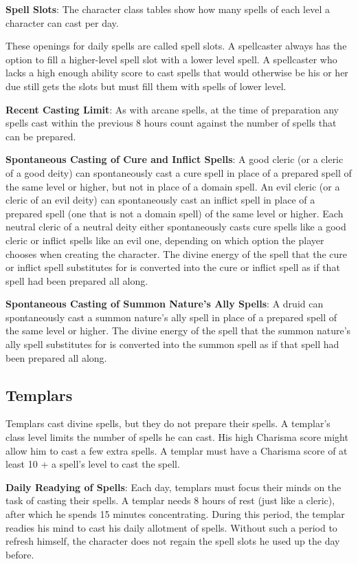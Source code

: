 \textbf{Spell Slots}: The character class tables show how many spells of each level a character can cast per day.

These openings for daily spells are called spell slots. A spellcaster always has the option to fill a higher-level spell slot with a lower level spell. A spellcaster who lacks a high enough ability score to cast spells that would otherwise be his or her due still gets the slots but must fill them with spells of lower level.

\textbf{Recent Casting Limit}: As with arcane spells, at the time of preparation any spells cast within the previous 8 hours count against the number of spells that can be prepared.

\textbf{Spontaneous Casting of Cure and Inflict Spells}: A good cleric (or a cleric of a good deity) can spontaneously cast a cure spell in place of a prepared spell of the same level or higher, but not in place of a domain spell. An evil cleric (or a cleric of an evil deity) can spontaneously cast an inflict spell in place of a prepared spell (one that is not a domain spell) of the same level or higher. Each neutral cleric of a neutral deity either spontaneously casts cure spells like a good cleric or inflict spells like an evil one, depending on which option the player chooses when creating the character. The divine energy of the spell that the cure or inflict spell substitutes for is converted into the cure or inflict spell as if that spell had been prepared all along.

\textbf{Spontaneous Casting of Summon Nature's Ally Spells}: A druid can spontaneously cast a summon nature's ally spell in place of a prepared spell of the same level or higher. The divine energy of the spell that the summon nature's ally spell substitutes for is converted into the summon spell as if that spell had been prepared all along.

\subsection{Templars}
Templars cast divine spells, but they do not prepare their spells. A templar's class level limits the number of spells he can cast. His high Charisma score might allow him to cast a few extra spells. A templar must have a Charisma score of at least 10 + a spell's level to cast the spell.

\textbf{Daily Readying of Spells}: Each day, templars must focus their minds on the task of casting their spells. A templar needs 8 hours of rest (just like a cleric), after which he spends 15 minutes concentrating. During this period, the templar readies his mind to cast his daily allotment of spells. Without such a period to refresh himself, the character does not regain the spell slots he used up the day before.

